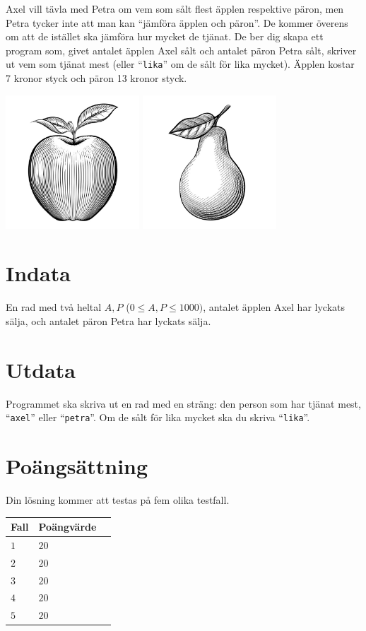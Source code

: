 Axel vill tävla med Petra om vem som sålt flest äpplen respektive päron, men Petra tycker inte att man kan ``jämföra äpplen och päron''. De kommer överens om att de istället ska jämföra hur mycket de tjänat. De ber dig skapa ett program som, givet antalet äpplen Axel sålt och antalet päron Petra sålt, skriver ut vem som tjänat mest (eller ``\texttt{lika}'' om de sålt för lika mycket). Äpplen kostar 7 kronor styck och päron 13 kronor styck.

\begin{center}
  \includegraphics[width=5cm]{apple.jpg}
  \includegraphics[width=5cm]{pear.jpg}
\end{center}

\section*{Indata}
En rad med två heltal $A,P$ ($0 \le A,P \le 1000)$, antalet äpplen Axel har lyckats sälja, och antalet päron Petra har lyckats sälja. 

\section*{Utdata}
Programmet ska skriva ut en rad med en sträng: den person som har tjänat mest, ``\texttt{axel}'' eller ``\texttt{petra}''. Om de sålt för lika mycket ska du skriva ``\texttt{lika}''.

\section*{Poängsättning}
Din lösning kommer att testas på fem olika testfall.

\noindent
\begin{tabular}{| l | l | l |}
  \hline
  Fall & Poängvärde  \\ \hline
  $1$    & $20$     \\ \hline 
  $2$    & $20$     \\ \hline 
  $3$    & $20$     \\ \hline
  $4$    & $20$     \\ \hline
  $5$    & $20$     \\ \hline
\end{tabular}
